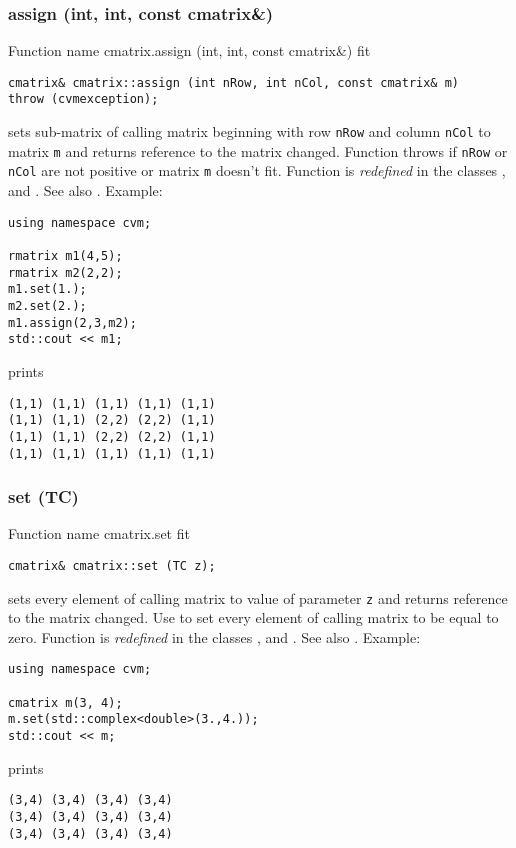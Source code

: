\subsubsection{assign (int, int, const cmatrix\&)}
Function%
\pdfdest name {cmatrix.assign (int, int, const cmatrix&)} fit
\begin{verbatim}
cmatrix& cmatrix::assign (int nRow, int nCol, const cmatrix& m)
throw (cvmexception);
\end{verbatim}
sets sub-matrix of  calling matrix beginning with \Based row
\verb"nRow" and column \verb"nCol" to  matrix \verb"m" and
returns  reference to the matrix changed. Function throws 
  if \verb"nRow"
or \verb"nCol" are not positive or matrix \verb"m" doesn't fit.
Function is \emph{redefined} in the classes
,  
and .
See also .
Example:
\begin{Verbatim}
using namespace cvm;

rmatrix m1(4,5);
rmatrix m2(2,2);
m1.set(1.);
m2.set(2.);
m1.assign(2,3,m2);
std::cout << m1;
\end{Verbatim}
prints
\begin{Verbatim}
(1,1) (1,1) (1,1) (1,1) (1,1)
(1,1) (1,1) (2,2) (2,2) (1,1)
(1,1) (1,1) (2,2) (2,2) (1,1)
(1,1) (1,1) (1,1) (1,1) (1,1)
\end{Verbatim}
\newpage



\subsubsection{set (TC)}
Function%
\pdfdest name {cmatrix.set} fit
\begin{verbatim}
cmatrix& cmatrix::set (TC z);
\end{verbatim}
sets every element of  calling matrix to  value of
parameter \verb"z" and returns  reference to
the matrix changed.
Use  to set every element
of  calling matrix to be equal to zero.
Function is \emph{redefined} in the classes
,  
and .
See also .
Example:
\begin{Verbatim}
using namespace cvm;

cmatrix m(3, 4);
m.set(std::complex<double>(3.,4.));
std::cout << m;
\end{Verbatim}
prints
\begin{Verbatim}
(3,4) (3,4) (3,4) (3,4)
(3,4) (3,4) (3,4) (3,4)
(3,4) (3,4) (3,4) (3,4)
\end{Verbatim}
\newpage





